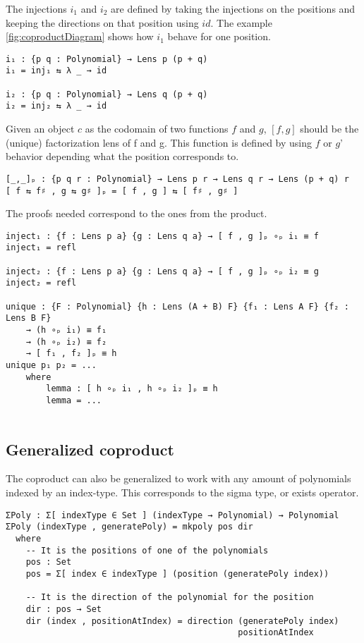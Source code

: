 The injections $i_1$ and $i_2$ are defined by taking the injections on the positions and keeping the directions on that position using $id$. The example \ref{fig:coproductDiagram} shows how $i_1$ behave for one position. 

\begin{verbatim}
i₁ : {p q : Polynomial} → Lens p (p + q)
i₁ = inj₁ ⇆ λ _ → id

i₂ : {p q : Polynomial} → Lens q (p + q)
i₂ = inj₂ ⇆ λ _ → id
\end{verbatim}


Given an object $c$ as the codomain of two functions $f$ and $g$, $[f,g]$ should be the (unique) factorization lens of f and g. This function is defined by using $f$ or $g$' behavior depending what the position corresponds to.


\begin{verbatim}
[_,_]ₚ : {p q r : Polynomial} → Lens p r → Lens q r → Lens (p + q) r
[ f ⇆ f♯ , g ⇆ g♯ ]ₚ = [ f , g ] ⇆ [ f♯ , g♯ ]
\end{verbatim}

The proofs needed correspond to the ones from the product. 
\begin{verbatim}
inject₁ : {f : Lens p a} {g : Lens q a} → [ f , g ]ₚ ∘ₚ i₁ ≡ f
inject₁ = refl

inject₂ : {f : Lens p a} {g : Lens q a} → [ f , g ]ₚ ∘ₚ i₂ ≡ g
inject₂ = refl

unique : {F : Polynomial} {h : Lens (A + B) F} {f₁ : Lens A F} {f₂ : Lens B F} 
    → (h ∘ₚ i₁) ≡ f₁
    → (h ∘ₚ i₂) ≡ f₂
    → [ f₁ , f₂ ]ₚ ≡ h
unique p₁ p₂ = ...
    where
        lemma : [ h ∘ₚ i₁ , h ∘ₚ i₂ ]ₚ ≡ h
        lemma = ...
        
\end{verbatim}


\subsection{Generalized coproduct}
The coproduct can also be generalized to work with any amount of polynomials indexed by an index-type. This corresponds to the sigma type, or exists operator.
\begin{verbatim}
ΣPoly : Σ[ indexType ∈ Set ] (indexType → Polynomial) → Polynomial
ΣPoly (indexType , generatePoly) = mkpoly pos dir
  where
    -- It is the positions of one of the polynomials
    pos : Set 
    pos = Σ[ index ∈ indexType ] (position (generatePoly index))

    -- It is the direction of the polynomial for the position
    dir : pos → Set
    dir (index , positionAtIndex) = direction (generatePoly index)
                                              positionAtIndex
\end{verbatim}

